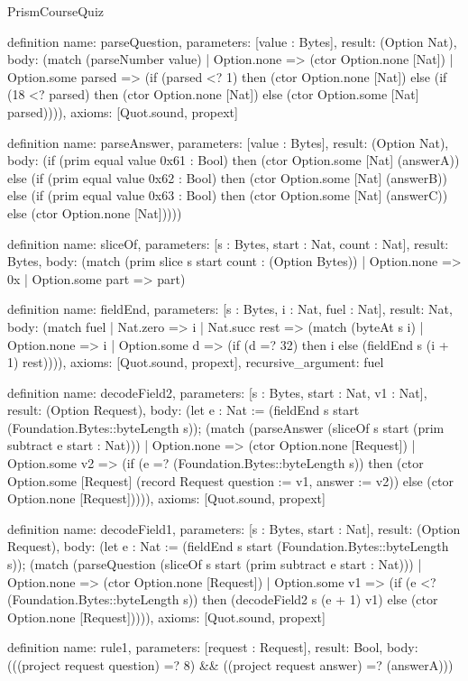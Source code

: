 \begin{lexlean}{PrismCourseQuiz}
\begin{semanticmodule}
definition{
  name: parseQuestion,
  parameters: [value : Bytes],
  result: (Option Nat),
  body: (match (parseNumber value)
    | Option.none => (ctor Option.none [Nat])
    | Option.some parsed => (if (parsed <? 1) then (ctor Option.none [Nat]) else (if (18 <? parsed) then (ctor Option.none [Nat]) else (ctor Option.some [Nat] parsed)))),
  axioms: [Quot.sound, propext]
}

definition{
  name: parseAnswer,
  parameters: [value : Bytes],
  result: (Option Nat),
  body: (if (prim equal value 0x61 : Bool) then (ctor Option.some [Nat] (answerA)) else (if (prim equal value 0x62 : Bool) then (ctor Option.some [Nat] (answerB)) else (if (prim equal value 0x63 : Bool) then (ctor Option.some [Nat] (answerC)) else (ctor Option.none [Nat]))))
}

definition{
  name: sliceOf,
  parameters: [s : Bytes, start : Nat, count : Nat],
  result: Bytes,
  body: (match (prim slice s start count : (Option Bytes))
    | Option.none => 0x
    | Option.some part => part)
}

definition{
  name: fieldEnd,
  parameters: [s : Bytes, i : Nat, fuel : Nat],
  result: Nat,
  body: (match fuel
    | Nat.zero => i
    | Nat.succ rest => (match (byteAt s i)
      | Option.none => i
      | Option.some d => (if (d =? 32) then i else (fieldEnd s (i + 1) rest)))),
  axioms: [Quot.sound, propext],
  recursive_argument: fuel
}

definition{
  name: decodeField2,
  parameters: [s : Bytes, start : Nat, v1 : Nat],
  result: (Option Request),
  body: (let e : Nat := (fieldEnd s start (Foundation.Bytes::byteLength s)); (match (parseAnswer (sliceOf s start (prim subtract e start : Nat)))
    | Option.none => (ctor Option.none [Request])
    | Option.some v2 => (if (e =? (Foundation.Bytes::byteLength s)) then (ctor Option.some [Request] (record Request {question := v1, answer := v2})) else (ctor Option.none [Request])))),
  axioms: [Quot.sound, propext]
}

definition{
  name: decodeField1,
  parameters: [s : Bytes, start : Nat],
  result: (Option Request),
  body: (let e : Nat := (fieldEnd s start (Foundation.Bytes::byteLength s)); (match (parseQuestion (sliceOf s start (prim subtract e start : Nat)))
    | Option.none => (ctor Option.none [Request])
    | Option.some v1 => (if (e <? (Foundation.Bytes::byteLength s)) then (decodeField2 s (e + 1) v1) else (ctor Option.none [Request])))),
  axioms: [Quot.sound, propext]
}

definition{
  name: rule1,
  parameters: [request : Request],
  result: Bool,
  body: (((project request question) =? 8) && ((project request answer) =? (answerA)))
}


\end{semanticmodule}
\end{lexlean}
